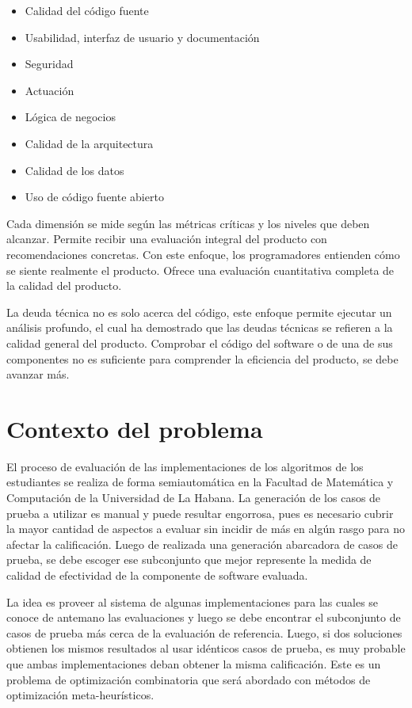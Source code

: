 \documentclass[a4paper,12pt]{book}
\begin{document}
		\begin{itemize}
			\item Calidad del código fuente
			\item Usabilidad, interfaz de usuario y documentación
			\item Seguridad
			\item Actuación
			\item Lógica de negocios
			\item Calidad de la arquitectura
			\item Calidad de los datos
			\item Uso de código fuente abierto
		\end{itemize}
	
		Cada dimensión se mide según las métricas críticas y los niveles que deben alcanzar. Permite recibir una evaluación integral del producto con recomendaciones concretas. Con este enfoque, los programadores entienden cómo se siente realmente el producto. Ofrece una evaluación cuantitativa completa de la calidad del producto.
		
		La deuda técnica no es solo acerca del código, este enfoque permite ejecutar un análisis profundo, el cual ha demostrado que las deudas técnicas se refieren a la calidad general del producto. Comprobar el código del software o de una de sus componentes no es suficiente para comprender la eficiencia del producto, se debe avanzar más.
		
	\section{Contexto del problema}

		El proceso de evaluación de las implementaciones de los algoritmos de los estudiantes se realiza de forma semiautomática en la Facultad de Matemática y Computación de la Universidad de La Habana. La generación de los casos de prueba a utilizar es manual y puede resultar engorrosa, pues es necesario cubrir la mayor cantidad de aspectos a evaluar sin incidir de más en algún rasgo para no afectar la calificación. Luego de realizada una generación abarcadora de casos de prueba, se debe escoger ese subconjunto que mejor represente la medida de calidad de efectividad de la componente de software evaluada. %
		
		La idea es proveer al sistema de algunas implementaciones para las cuales se conoce de antemano las evaluaciones y luego se debe encontrar el subconjunto de casos de prueba más cerca de la evaluación de referencia. Luego, si dos soluciones obtienen los mismos resultados al usar idénticos casos de prueba, es muy probable que ambas implementaciones deban obtener la misma calificación. Este es un problema de optimización combinatoria que será abordado con métodos de optimización meta-heurísticos.
		
\end{document}
